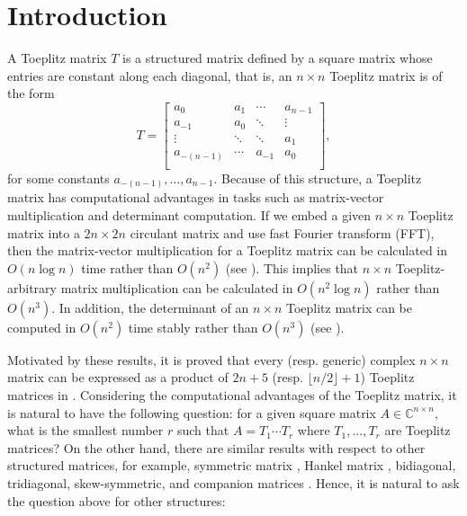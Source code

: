 \documentclass[reqno]{amsart}
\theoremstyle{definition}
\numberwithin{equation}{section}
\begin{document}


\maketitle

\tableofcontents

\section{Introduction}

A Toeplitz matrix $T$ is a structured matrix defined by a square matrix whose entries are constant along each diagonal, that is, an $n \times n$ Toeplitz matrix is of the form
\begin{equation}\label{eq:Toeplitz}
    T = 
    \begin{bmatrix}
        a_{0} & a_{1} & \cdots & a_{n-1}\\
        a_{-1} & a_{0} & \ddots & \vdots \\
        \vdots & \ddots & \ddots & a_{1}\\
        a_{-(n-1)} & \cdots & a_{-1} & a_{0}\\
    \end{bmatrix},
\end{equation}
for some constants $a_{-(n-1)},...,a_{n-1}$. Because of this structure, a Toeplitz matrix has computational advantages in tasks such as matrix-vector multiplication and determinant computation. If we embed a given $n \times n$ Toeplitz matrix into a $2n \times 2n$ circulant matrix and use fast Fourier transform (FFT), then the matrix-vector multiplication for a Toeplitz matrix can be calculated in $O(n\log n)$ time rather than $O(n^2)$ (see \cite[P4.8.6]{golub2013matrix}). This implies that $n \times n$ Toeplitz-arbitrary matrix multiplication can be calculated in $O(n^2\log n)$ rather than $O(n^3)$. In addition, the determinant of an $n \times n$ Toeplitz matrix can be computed in $O(n^2)$ time stably rather than $O(n^3)$ (see \cite{bareiss1969numerical, bojanczyk1995stability}). 

Motivated by these results, it is proved that every (resp. generic) complex $n \times n$ matrix can be expressed as a product of $2n+5$ (resp. $\lfloor n/2 \rfloor+1$) Toeplitz matrices in \cite{ye2016every}. Considering the computational advantages of the Toeplitz matrix, it is natural to have the following question: for a given square matrix $A \in \mathbb{C}^{n \times n}$, what is the smallest number $r$ such that $A=T_1\cdots T_r$ where $T_1,...,T_r$ are Toeplitz matrices? On the other hand, there are similar results with respect to other structured matrices, for example, symmetric matrix \cite{bosch1986factorization}, Hankel matrix \cite{ye2016every}, bidiagonal, tridiagonal, skew-symmetric, and companion matrices \cite{ye2017new}. Hence, it is natural to ask the question above for other structures:
\end{document}
